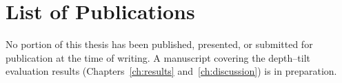 \chapter*{\rm\bfseries List of Publications}
\label{ch:publications}

No portion of this thesis has been published, presented, or submitted for
publication at the time of writing. A manuscript covering the depth--tilt
evaluation results (Chapters~\ref{ch:results} and~\ref{ch:discussion}) is
in preparation.
